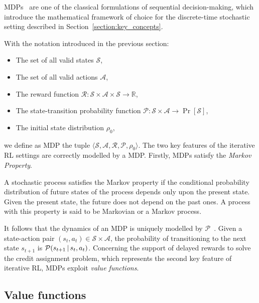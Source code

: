 \aclp{MDP}~\parencite{puterman_markov_2005, sutton_reinforcement_2018} are one of the classical formulations of sequential decision-making, which introduce the mathematical framework of choice for the discrete-time stochastic setting described in Section~\ref{section:key_concepts}.

With the notation introduced in the previous section:
%
\begin{itemize}
    \item The set of all valid states $\mathcal{S}$,
    \item The set of all valid actions $\mathcal{A}$,
    \item The reward function $\mathcal{R}: \mathcal{S} \times \mathcal{A} \times \mathcal{S} \to \mathbb{R}$,
    \item The state-transition probability function $\mathcal{P}: \mathcal{S} \times \mathcal{A} \to \operatorname{Pr}[\mathcal{S}]$,
    \item The initial state distribution $\rho_0$, 
\end{itemize}
%
we define as \ac{MDP} the tuple $\langle \mathcal{S}, \mathcal{A}, \mathcal{R}, \mathcal{P}, \mathcal{\rho}_0 \rangle$.
%
The two key features of the iterative \ac{RL} settings are correctly modelled by a \ac{MDP}.
Firstly, \acp{MDP} satisfy the \emph{Markov Property}.
%
\begin{definition*}
%
A stochastic process satisfies the Markov property if the conditional probability distribution of future states of the process depends only upon the present state.
Given the present state, the future does not depend on the past ones.
A process with this property is said to be Markovian or a Markov process.
%
\end{definition*}
%
It follows that the dynamics of an \ac{MDP} is uniquely modelled by $\mathcal{P}$~\parencite{sutton_reinforcement_2018}.
Given a state-action pair $(s_t, a_t) \in \mathcal{S} \times \mathcal{A}$, the probability of transitioning to the next state $s_{t+1}$ is $\mathcal{P}(s_{t+1} \operatorname{\mid} s_t, a_t)$.
Concerning the support of delayed rewards to solve the credit assignment problem, which represents the second key feature of iterative \ac{RL}, \acp{MDP} exploit \emph{value functions}.

\subsection{Value functions}
\label{section:value_functions}

